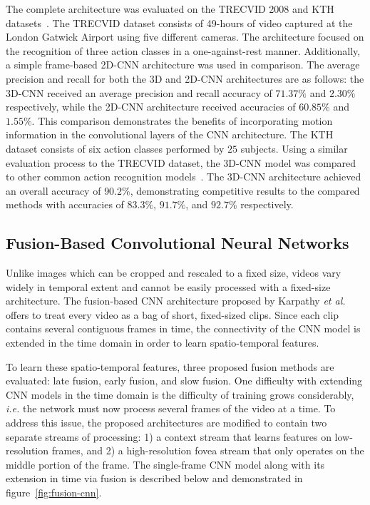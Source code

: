 The complete architecture was evaluated on the TRECVID 2008 and KTH datasets~\cite{Schuldt:2004}. The TRECVID dataset consists of 49-hours of video captured at the London Gatwick Airport using five different cameras. The architecture focused on the recognition of three action classes in a one-against-rest manner. Additionally, a simple frame-based 2D-CNN architecture was used in comparison. The average precision and recall for both the 3D and 2D-CNN architectures are as follows: the 3D-CNN received an average precision and recall accuracy of $71.37\%$ and $2.30\%$ respectively, while the 2D-CNN architecture received accuracies of $60.85\%$ and $1.55\%$. This comparison demonstrates the benefits of incorporating motion information in the convolutional layers of the CNN architecture. The KTH dataset consists of six action classes performed by $25$ subjects. Using a similar evaluation process to the TRECVID dataset, the 3D-CNN model was compared to other common action recognition models~\cite{Niebles:2008, Jhuang:2007, Schindler:2008}. The 3D-CNN architecture achieved an overall accuracy of $90.2\%$, demonstrating competitive results to the compared methods with accuracies of $83.3\%$,  $91.7\%$, and $92.7\%$ respectively. 

\subsection{Fusion-Based Convolutional Neural Networks}
Unlike images which can be cropped and rescaled to a fixed size, videos vary widely in temporal extent and cannot be easily processed with a fixed-size architecture. The fusion-based CNN architecture proposed by Karpathy \emph{et al.}~\cite{LargeScaleFusionCNN:2014} offers to treat every video as a bag of short, fixed-sized clips. Since each clip contains several contiguous frames in time, the connectivity of the CNN model is extended in the time domain in order to learn spatio-temporal features.

To learn these spatio-temporal features, three proposed fusion methods are evaluated: late fusion, early fusion, and slow fusion. One difficulty with extending CNN models in the time domain is the difficulty of training grows considerably, \emph{i.e.} the network must now process several frames of the video at a time. To address this issue, the proposed architectures are modified to contain two separate streams of processing: 1) a context stream that learns features on low-resolution frames, and 2) a high-resolution fovea stream that only operates on the middle portion of the frame. The single-frame CNN model along with its extension in time via fusion is described below and demonstrated in figure~\ref{fig:fusion-cnn}.

